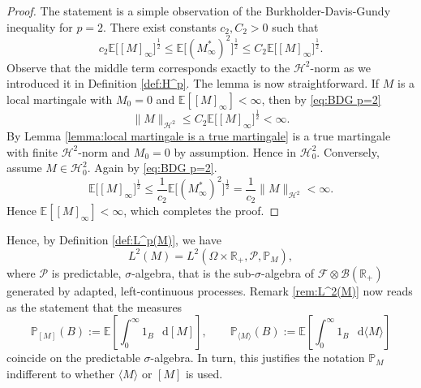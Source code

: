 \documentclass[11pt,a4paper,twoside,openany]{report}
\numberwithin{equation}{section}
\newcommand{\diff}{\mathop{}\!\mathrm{d}}
\theoremstyle{plain} %
\theoremstyle{definition} %
\theoremstyle{remark} %
\begin{document}
\begin{proof}
 The statement is a simple observation of the Burkholder-Davis-Gundy inequality for \(p=2\). There exist constants \(c_2,C_2>0\) such that 
 \begin{equation}\label{eq:BDG p=2}
     c_2\mathbb{E}\big[[M]_{\infty}\big]^{\frac{1}{2}}\leq\mathbb{E}\big[(M^*_\infty)^2\big]^{\frac{1}{2}}\leq  C_2\mathbb{E}\big[[M]_{\infty}\big]^{\frac{1}{2}}.
 \end{equation}
 Observe that the middle term corresponds exactly to the \(\mathcal{H}^2\)-norm as we introduced it in Definition \ref{def:H^p}. The lemma is now straightforward. If \(M\) is a local martingale with \(M_0=0\) and \(\mathbb{E}[[M]_\infty]<\infty\), then by \eqref{eq:BDG p=2} 
 \begin{equation*}
     \lVert M\rVert_{\mathcal{H}^2}\leq C_2\mathbb{E}\big[[M]_{\infty}\big]^{\frac{1}{2}}<\infty.
 \end{equation*}
 By Lemma \ref{lemma:local martingale is a true martingale} is a true martingale with finite \(\mathcal{H}^2\)-norm and \(M_0=0\) by assumption. Hence in \(\mathcal{H}^2_0\). Conversely, assume \(M\in\mathcal{H}^2_0\). Again by \eqref{eq:BDG p=2}.
 \begin{equation*}
     \mathbb{E}\big[[M]_{\infty}\big]^{\frac{1}{2}}\leq\frac{1}{c_2}\mathbb{E}\big[(M^*_\infty)^2\big]^{\frac{1}{2}}=\frac{1}{c_2}\lVert M\rVert_{\mathcal{H}^2}<\infty.
 \end{equation*}
 Hence \(\mathbb{E}[[M]_{\infty}]<\infty\), which completes the proof.
\end{proof}
Hence, by Definition \ref{def:L^p(M)}, we have
\begin{equation}\label{eq:L^2(M) as Hilbert space}
    L^2(M) = L^2(\Omega\times \mathbb{R}_+,\mathcal{P},\mathbb{P}_M),
\end{equation}
where \(\mathcal{P}\) is predictable, \(\sigma\)-algebra, that is the sub-\(\sigma\)-algebra of \(\mathcal{F}\otimes\mathcal{B}(\mathbb{R}_+)\) generated by adapted, left-continuous processes. Remark \ref{rem:L^2(M)} now reads as the statement that 
the measures
\begin{equation*}
    \mathbb{P}_{[M]}(B):=\mathbb E\left[\int_0^{\infty} 1_B\,\diff [M]\right],
\qquad
\mathbb{P}_{\langle M\rangle}(B):=\mathbb E\left[\int_0^{\infty} 1_B\,\diff \langle M\rangle\right]
\end{equation*}
coincide on the predictable \(\sigma\)-algebra. In turn, this justifies the notation \(\mathbb{P}_M\) indifferent to whether \(\langle M\rangle\) or \([M]\) is used.
\end{document}

